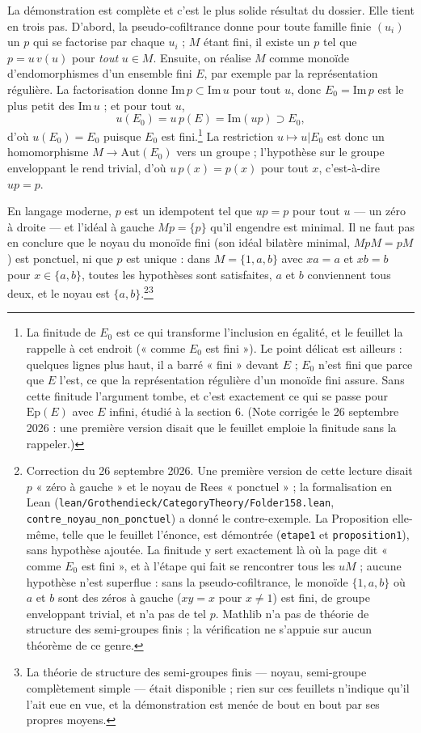 \documentclass[11pt,a4paper]{article}
\begin{document}
La démonstration est complète et c'est le plus solide résultat du dossier.
Elle tient en trois pas. D'abord, la pseudo-cofiltrance donne pour toute
famille finie $(u_{i})$ un $p$ qui se factorise par chaque $u_{i}$ ; $M$ étant
fini, il existe un $p$ tel que $p = u\,v(u)$ pour \emph{tout} $u \in M$.
Ensuite, on réalise $M$ comme monoïde d'endomorphismes d'un ensemble fini $E$,
par exemple par la représentation régulière. La factorisation donne
$\mathrm{Im}\,p \subset \mathrm{Im}\,u$ pour tout $u$, donc
$E_{0} = \mathrm{Im}\,p$ est le plus petit des $\mathrm{Im}\,u$ ; et pour tout
$u$,
\[
  u(E_{0}) = u\,p(E) = \mathrm{Im}(up) \supset E_{0},
\]
d'où $u(E_{0}) = E_{0}$ puisque $E_{0}$ est fini.\footnote{La finitude de
$E_{0}$ est ce qui transforme l'inclusion en égalité, et le feuillet la
rappelle à cet endroit (« comme $E_0$ est fini »). Le point délicat est
ailleurs : quelques lignes plus haut, il a barré « fini » devant $E$ ; $E_0$
n'est fini que parce que $E$ l'est, ce que la représentation régulière d'un
monoïde fini assure. Sans cette finitude l'argument tombe, et c'est
exactement ce qui se passe pour $\mathrm{Ep}(E)$ avec $E$ infini, étudié à la
section 6. (Note corrigée le 26 septembre 2026 : une première version disait
que le feuillet emploie la finitude sans la rappeler.)} La restriction
$u \mapsto u|E_{0}$ est donc un homomorphisme $M \to \mathrm{Aut}(E_{0})$ vers
un groupe ; l'hypothèse sur le groupe enveloppant le rend trivial, d'où
$u\,p(x) = p(x)$ pour tout $x$, c'est-à-dire $up = p$.

En langage moderne, $p$ est un idempotent tel que $up = p$ pour tout $u$ ---
un zéro à droite --- et l'idéal à gauche $Mp = \{p\}$ qu'il engendre est
minimal. Il ne faut pas en conclure que le noyau du monoïde fini (son idéal
bilatère minimal, $MpM = pM$) est ponctuel, ni que $p$ est unique : dans
$M = \{1, a, b\}$ avec $xa = a$ et $xb = b$ pour $x \in \{a, b\}$, toutes les
hypothèses sont satisfaites, $a$ et $b$ conviennent tous deux, et le noyau est
$\{a, b\}$.\footnote{Correction du 26 septembre 2026. Une première version de
cette lecture disait $p$ « zéro à gauche » et le noyau de Rees « ponctuel » ;
la formalisation en Lean (\texttt{lean/Grothendieck/CategoryTheory/Folder158.lean},
\texttt{contre\_noyau\_non\_ponctuel}) a donné le contre-exemple. La
Proposition elle-même, telle que le feuillet l'énonce, est démontrée
(\texttt{etape1} et \texttt{proposition1}), sans hypothèse ajoutée. La finitude
y sert exactement là où la page dit « comme $E_{0}$ est fini », et à l'étape
qui fait se rencontrer tous les $uM$ ; aucune hypothèse n'est superflue : sans
la pseudo-cofiltrance, le monoïde $\{1, a, b\}$ où $a$ et $b$ sont des zéros à
gauche ($xy = x$ pour $x \neq 1$) est fini, de groupe enveloppant trivial, et
n'a pas de tel $p$. Mathlib n'a pas de théorie de structure des semi-groupes
finis ; la vérification ne s'appuie sur aucun théorème de ce genre.}\footnote{La
théorie de structure des semi-groupes finis — noyau, semi-groupe complètement
simple — était disponible ; rien sur ces feuillets n'indique qu'il l'ait eue
en vue, et la démonstration est menée de bout en bout par ses propres moyens.}
\end{document}
